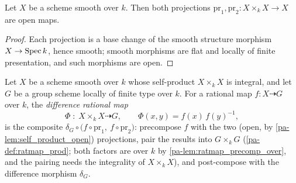 \begin{lemma}
  \label{pa-lem:self_product_open}
  \leanok

  Let \(X\) be a scheme smooth over \(k\). Then both projections
  \(\mathrm{pr}_1, \mathrm{pr}_2 : X \times_k X \to X\) are open maps.
\end{lemma}
\begin{proof}
  \leanok
  Each projection is a base change of the smooth structure morphism
  \(X \to \operatorname{Spec} k\), hence smooth; smooth morphisms are flat and locally of
  finite presentation, and such morphisms are open.
\end{proof}

\begin{definition}
  \label{pa-def:difference_map}
  \leanok

  Let \(X\) be a scheme smooth over \(k\) whose self-product \(X \times_k X\) is
  integral, and let \(G\) be a group scheme locally of finite type over \(k\).
  For a rational map \(f : X \dashrightarrow G\) over \(k\), the
  \emph{difference rational map}
  \[
    \Phi \;:\; X \times_k X \dashrightarrow G,
    \qquad
    \Phi(x, y) = f(x)\, f(y)^{-1},
  \]
  is the composite \(\delta_G \circ \bigl(f \circ \mathrm{pr}_1,\ f \circ
  \mathrm{pr}_2\bigr)\): precompose \(f\) with the two (open, by
  \ref{pa-lem:self_product_open}) projections, pair the results into
  \(G \times_k G\) (\ref{pa-def:ratmap_prod}; both factors are over \(k\) by
  \ref{pa-lem:ratmap_precomp_over}, and the pairing needs the integrality of
  \(X \times_k X\)), and post-compose with the difference morphism
  \(\delta_G\).
\end{definition}

